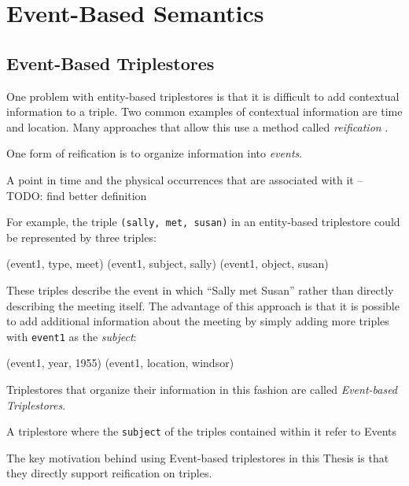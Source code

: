 \documentclass[../main.tex]{subfiles}
\begin{document}
\chapter {Event-Based Semantics}

\section{Event-Based Triplestores}

One problem with entity-based triplestores is that it is difficult to add contextual information to a triple.  Two common examples of contextual information are time and location.  Many approaches that allow this use a method called {\em reification} \cite{?}.

One form of reification is to organize information into {\em events}.

\begin{definition}[Event]
	A point in time and the physical occurrences that are associated with it \cite{?} -- TODO: find better definition
\end{definition}

For example, the triple \texttt{(sally, met, susan)} in an entity-based triplestore could be represented by three triples:

\begin{code}
	(event1, type, meet)
	(event1, subject, sally)
	(event1, object, susan)
\end{code}

These triples describe the event in which ``Sally met Susan'' rather than directly describing the meeting itself.  The advantage of this approach is that it is possible to add additional information about the meeting by simply adding more triples with \texttt{event1} as the {\em subject}:

\begin{code}
	(event1, year, 1955)
	(event1, location, windsor)
\end{code}

Triplestores that organize their information in this fashion are called {\em Event-based Triplestores}.

\begin{definition}
	A triplestore where the \texttt{subject} of the triples contained within it refer to Events\cite{frostagboola2014}
\end{definition}

The key motivation behind using Event-based triplestores in this Thesis is that they directly support reification on triples\cite{frostagboola2014}.
\end{document}
